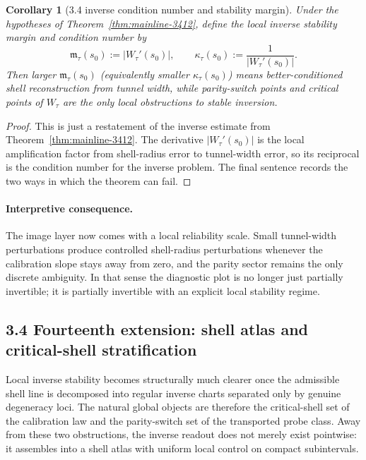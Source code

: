 \documentclass[12pt,a4paper]{article}
\newtheorem{corollary}[theorem]{Corollary}
\begin{document}
\begin{corollary}[3.4 inverse condition number and stability margin]
\label{cor:mainline-3412-condition}
Under the hypotheses of Theorem~\ref{thm:mainline-3412}, define the local inverse stability margin and condition number by
\[
 \mathfrak m_\tau(s_0):=|W_\tau'(s_0)|,
 \qquad
 \kappa_\tau(s_0):=\frac{1}{|W_\tau'(s_0)|}.
\]
Then larger $\mathfrak m_\tau(s_0)$ (equivalently smaller $\kappa_\tau(s_0)$) means better-conditioned shell reconstruction from tunnel width, while parity-switch points and critical points of $W_\tau$ are the only local obstructions to stable inversion.
\end{corollary}

\begin{proof}
This is just a restatement of the inverse estimate from Theorem~\ref{thm:mainline-3412}. The derivative $|W_\tau'(s_0)|$ is the local amplification factor from shell-radius error to tunnel-width error, so its reciprocal is the condition number for the inverse problem. The final sentence records the two ways in which the theorem can fail.
\end{proof}

\paragraph{Interpretive consequence.}
The image layer now comes with a local reliability scale. Small tunnel-width perturbations produce controlled shell-radius perturbations whenever the calibration slope stays away from zero, and the parity sector remains the only discrete ambiguity. In that sense the diagnostic plot is no longer just partially invertible; it is partially invertible with an explicit local stability regime.

\subsection*{3.4 Fourteenth extension: shell atlas and critical-shell stratification}
Local inverse stability becomes structurally much clearer once the admissible shell line is decomposed into regular inverse charts separated only by genuine degeneracy loci. The natural global objects are therefore the critical-shell set of the calibration law and the parity-switch set of the transported probe class. Away from these two obstructions, the inverse readout does not merely exist pointwise: it assembles into a shell atlas with uniform local control on compact subintervals.
\end{document}
